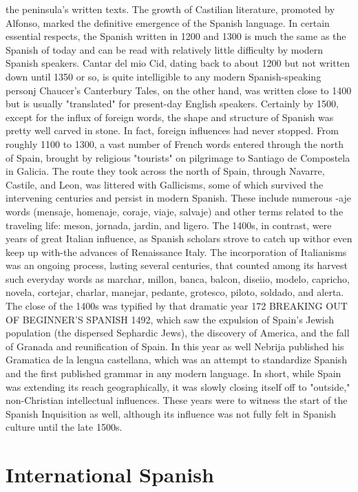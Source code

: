 the peninsula's written texts. The growth of Castilian literature, promoted by Alfonso, marked the definitive emergence of the Spanish
language.
In certain essential respects, the Spanish written in 1200 and
1300 is much the same as the Spanish of today and can be read with
relatively little difficulty by modern Spanish speakers. Cantar del mio
Cid, dating back to about 1200 but not written down until 1350 or so,
is quite intelligible to any modern Spanish-speaking personj Chaucer's
Canterbury Tales, on the other hand, was written close to 1400 but
is usually "translated" for present-day English speakers. Certainly by
1500, except for the influx of foreign words, the shape and structure of
Spanish was pretty well carved in stone.
In fact, foreign influences had never stopped. From roughly
1100 to 1300, a vast number of French words entered through the
north of Spain, brought by religious "tourists" on pilgrimage to Santiago de Compostela in Galicia. The route they took across the north
of Spain, through Navarre, Castile, and Leon, was littered with Gallicisms, some of which survived the intervening centuries and persist in
modern Spanish. These include numerous -aje words (mensaje, homenaje, coraje, viaje, salvaje) and other terms related to the traveling life:
meson, jornada, jardin, and ligero. The 1400s, in contrast, were years
of great Italian influence, as Spanish scholars strove to catch up withor even keep up with-the advances of Renaissance Italy. The incorporation of Italianisms was an ongoing process, lasting several centuries,
that counted among its harvest such everyday words as marchar, millon, banca, balcon, diseiio, modelo, capricho, novela, cortejar, charlar,
manejar, pedante, grotesco, piloto, soldado, and alerta.
The close of the 1400s was typified by that dramatic year
172 BREAKING OUT OF BEGINNER'S SPANISH
1492, which saw the expulsion of Spain's Jewish population (the dispersed Sephardic Jews), the discovery of America, and the fall of Granada and reunification of Spain. In this year as well Nebrija published
his Gramatica de la lengua castellana, which was an attempt to standardize Spanish and the first published grammar in any modern language. In short, while Spain was extending its reach geographically, it
was slowly closing itself off to "outside," non-Christian intellectual influences. These years were to witness the start of the Spanish Inquisition as well, although its influence was not fully felt in Spanish culture until the late 1500s.

\section{International Spanish}

